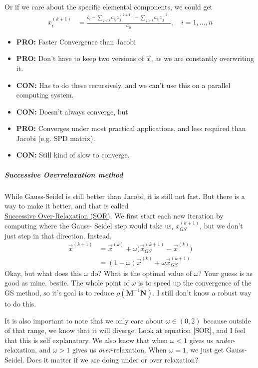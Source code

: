 \documentclass[a4paper,12pt]{article} %
\begin{document}
Or if we care about the specific elemental components, we could get
\begin{align}
	x_i^{(k+1)} &= \frac{b_i - \sum_{j<i} a_{ij}x_j^{(k+1)} - \sum_{j>i} a_{ij}x_j^{(k)}}{a_{ii}}, \quad i = 1,..., n
\end{align}
\begin{itemize}
	\item \textbf{PRO:} Faster Convergence than Jacobi
	\item \textbf{PRO:} Don't have to keep two versions of $\vec{x}$, as we are constantly overwriting it.
	\item \textbf{CON:} Has to do these recursively, and we can't use this on a parallel computing system.
	\item \textbf{CON:} Doesn't always converge, but
	\item \textbf{PRO:} Converges under most practical applications, and less required than Jacobi (e.g. SPD matrix).
	\item \textbf{CON:} Still kind of slow to converge. 
\end{itemize}
\subparagraph{Successive Overrelaxation method}
While Gauss-Seidel is still better than Jacobi, it is still not fast. But there is a way to make it better, and that is called \\
\underline{Successive Over-Relaxation (SOR)}. We first start each new iteration by computing where the Gauss- Seidel step would take us, $x_{GS}^{(k+1)}$, but we don't just step in that direction. Instead,
\begin{align}
	\vec{x}^{(k+1)} &= \vec{x}^{(k)} + \omega \big(\vec{x}_{GS}^{(k+1)} - \vec{x}^{(k)}\big)\\
	&= (1-\omega) \vec{x}^{(k)}  + \omega \vec{x}_{GS}^{(k+1)}\label{SOR}
\end{align}
Okay, but what does this $\omega$ do? What is the optimal value of $\omega$? Your guess is as good as mine. bestie. The whole point of $\omega$ is to speed up the convergence of the GS method, so it's goal is to reduce $\rho(\textbf{M}^{-1}\textbf{N})$. I still don't know a robust way to do this.

It is also important to note that we only care about $\omega\in(0,2)$ because outside of that range, we know that it will diverge. Look at equation $\ref{SOR}$, and I feel that this is self explanatory. We also know that when $\omega<1$ gives us \textit{under}-relaxation, and $\omega>1$ gives us \textit{over}-relaxation. When $\omega=1$, we just get Gauss- Seidel. Does it matter if we are doing under or over relaxation?
\end{document}
